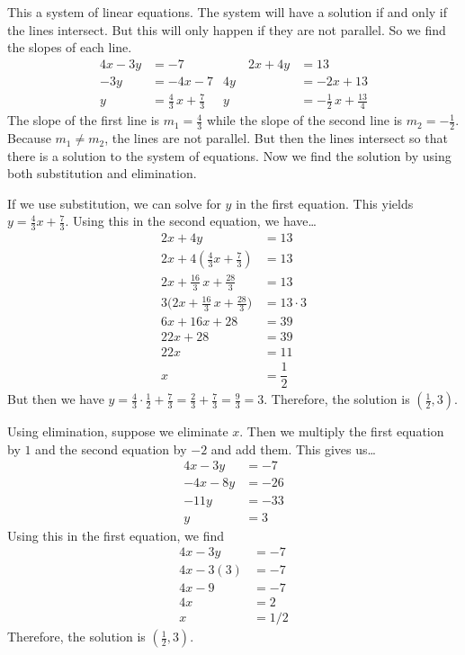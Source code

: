 \documentclass[11pt,letterpaper]{article}
\begin{document}
\sol This a system of linear equations. The system will have a solution if and only if the lines intersect. But this will only happen if they are not parallel. So we find the slopes of each line.
	\[
	\begin{aligned}
	4x - 3y&= -7 &\quad\quad 2x + 4y&= 13 \\
	-3y&= -4x - 7 & 4y&= -2x + 13 \\
	y&= \frac{4}{3}\,x + \frac{7}{3} & y&= -\frac{1}{2}\,x + \frac{13}{4}
	\end{aligned}
	\]
The slope of the first line is $m_1= \frac{4}{3}$ while the slope of the second line is $m_2= -\frac{1}{2}$. Because $m_1 \neq m_2$, the lines are not parallel. But then the lines intersect so that there is a solution to the system of equations. Now we find the solution by using both substitution and elimination. 

If we use substitution, we can solve for $y$ in the first equation. This yields $y= \frac{4}{3} x + \frac{7}{3}$. Using this in the second equation, we have\dots
	\[
	\begin{aligned}
	2x + 4y&= 13 \\
	2x + 4 \left( \frac{4}{3} x + \frac{7}{3} \right)&= 13 \\
	2x + \frac{16}{3}\, x + \frac{28}{3}&= 13 \\
	3 \bigg( 2x + \frac{16}{3}\, x + \frac{28}{3} \bigg)&= 13 \cdot 3 \\
	6x + 16x + 28&= 39 \\
	22x + 28&= 39 \\
	22x&= 11 \\
	x&= \dfrac{1}{2}
	\end{aligned}
	\]
But then we have $y= \frac{4}{3} \cdot \frac{1}{2} + \frac{7}{3}= \frac{2}{3} + \frac{7}{3}= \frac{9}{3}= 3$. Therefore, the solution is $(\frac{1}{2}, 3)$. \pspace

Using elimination, suppose we eliminate $x$. Then we multiply the first equation by $1$ and the second equation by $-2$ and add them. This gives us\dots
	\[
	\begin{aligned}
	4x - 3y&= -7 \\
	-4x - 8y&= -26 \\ \hline
	-11y&= -33 \\
	y&= 3
	\end{aligned}
	\] 
Using this in the first equation, we find
	\[
	\begin{aligned}
	4x - 3y&= -7 \\
	4x - 3(3)&= -7 \\
	4x - 9&= -7 \\
	4x&= 2 \\
	x&= 1/2
	\end{aligned}
	\]
Therefore, the solution is $(\frac{1}{2}, 3)$. 
\end{document}
